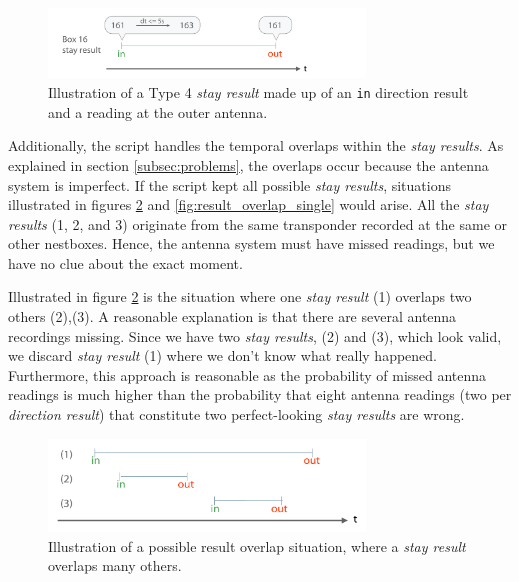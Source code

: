 \begin{figure}[htpb]
\begin{center}
  \includegraphics[width=0.75\textwidth]{assets/pdf/stay_result_type_4_schema.pdf}
  \caption[Illustration of a type 4 \textit{stay result}]{Illustration of a Type 4 \textit{stay result} made up of an \lstinline|in| direction result and a reading at the outer antenna.}
  \label{fig:type_4_stay_result}
\end{center}
\end{figure}

Additionally, the script handles the temporal overlaps within the \textit{stay results}. As explained in section \ref{subsec:problems}, the overlaps occur because the antenna system is imperfect. If the script kept all possible \textit{stay results}, situations illustrated in figures \ref{fig:result_overlap} and \ref{fig:result_overlap_single} would arise. All the \textit{stay results} (1, 2, and 3) originate from the same transponder recorded at the same or other nestboxes. Hence, the antenna system must have missed readings, but we have no clue about the exact moment.  

Illustrated in figure \ref{fig:result_overlap} is the situation where one \textit{stay result} (1) overlaps two others (2),(3). A reasonable explanation is that there are several antenna recordings missing. Since we have two \textit{stay results}, (2) and (3), which look valid, we discard \textit{stay result} (1) where we don't know what really happened. Furthermore, this approach is reasonable as the probability of missed antenna readings is much higher than the probability that eight antenna readings (two per \textit{direction result}) that constitute two perfect-looking \textit{stay results} are wrong.

\begin{figure}[htpb]
\begin{center}
  \includegraphics[width=0.75\textwidth]{assets/pdf/result_overlaps_schema.pdf}
  \caption[Illustration of a possible result overlap situation]{Illustration of a possible result overlap situation, where a \textit{stay result} overlaps many others.}
  \label{fig:result_overlap}
\end{center}
\end{figure}


